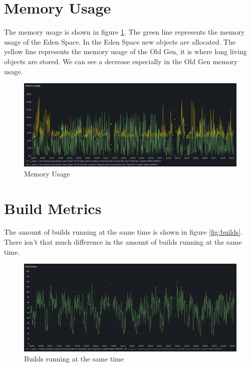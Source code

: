 \section{Memory Usage}%
\label{sec:memory-usage}

The memory usage is shown in figure \ref{fig:memory}. The green line represents the memory usage of the Eden Space. In the Eden Space new objects are allocated. The yellow line represents the memory usage of the Old Gen, it is where long living objects are stored. We can see a decrease especially in the Old Gen memory usage. 

\begin{figure}[htbp]
    \centering
    \includegraphics[width=\textwidth]{graphics/memory.png}
    \caption{Memory Usage}
    \label{fig:memory}
\end{figure}

\section{Build Metrics}%
\label{sec:build-metrics}

The amount of builds running at the same time is shown in figure \ref{fig:builds}. There isn't that much difference in the amount of builds running at the same time.

\begin{figure}[htbp]
    \centering
    \includegraphics[width=\textwidth]{graphics/builds running.png}
    \caption{Builds running at the same time}
    \label{fig:builds-running}
\end{figure}

